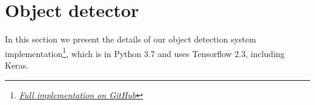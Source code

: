 \section{Object detector} \label{object_detector}
    
    In this section we present the details of our object detection system implementation\footnote{\href{https://github.com/ComanacDragos/PublicTransportDetector}{\textit{Full implementation on GitHub}}}, which is in Python 3.7 and uses Tensorflow 2.3, including Keras.%
    
    
    
    
    
    
    
    